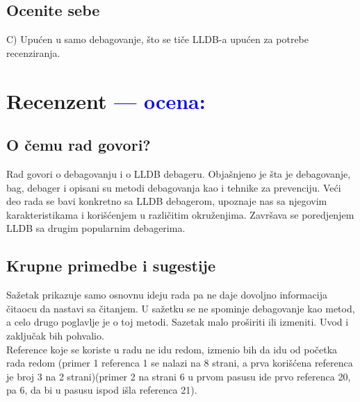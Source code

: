 \documentclass[a4paper]{report}
\newcommand{\odgovor}[1]{\textcolor{blue}{#1}}
\begin{document}
\section{Ocenite sebe}
C) Upućen u samo debagovanje, što se tiče LLDB-a upućen za potrebe recenziranja.

\chapter{Recenzent \odgovor{--- ocena:} }


\section{O čemu rad govori?}
Rad govori o debagovanju i o LLDB debageru. Objašnjeno je šta je debagovanje, bag, debager i opisani su metodi debagovanja kao i tehnike za prevenciju. Veći deo rada se bavi konkretno sa LLDB debagerom, upoznaje nas sa njegovim karakteristikama i korišćenjem u različitim okruženjima. Završava se poredjenjem LLDB sa drugim popularnim debagerima.

\section{Krupne primedbe i sugestije} 
\label{section:kpis}
Sažetak prikazuje samo osnovnu ideju rada pa ne daje dovoljno informacija čitaocu da nastavi sa čitanjem. U sažetku se ne spominje debagovanje kao metod, a celo drugo poglavlje je o toj metodi.  Sazetak malo proširiti ili izmeniti. Uvod i zaključak bih pohvalio. \\
Reference koje se koriste u radu ne idu redom, izmenio bih da idu od početka rada redom (primer 1 referenca 1 se nalazi na 8 strani, a prva korišćena referenca je broj 3 na 2 strani)(primer 2 na strani 6 u prvom pasusu ide prvo referenca 20, pa 6, da bi u pasusu ispod išla referenca 21).
\end{document}
